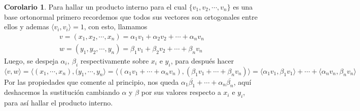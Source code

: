 \documentclass[10pt]{article}
\theoremstyle{definition}
\newtheorem{corollary}{Corolario}[theorem]
\begin{document}
\begin{corollary}
    Para hallar un producto interno para el cual $\{v_1,v_2,\cdots,v_n\}$ es una base ortonormal primero recordemos que todos sus vectores son ortogonales entre ellos y ademas $\langle v_i,v_i\rangle=1$, con esto, llamamos
    $$\begin{matrix}
v=( x_{1} ,x_{2} ,\cdots ,x_{n}) =\alpha _{1} v_{1} +\alpha _{2} v_{2} +\cdots +\alpha _{n} v_{n}\\
w=( y_{1} ,y_{2} ,\cdots ,y_{n}) =\beta _{1} v_{1} +\beta _{2} v_{2} +\cdots +\beta _{n} v_{n}
\end{matrix}$$
Luego, se despeja $\alpha_i,\ \beta_i$ respectivamente sobre $x_i$ e $y_i$, para después hacer $$\langle v,w\rangle=\langle (x_1,\cdots,x_n),(y_1,\cdots,y_n\rangle=\langle(\alpha_1v_1+\cdots+\alpha_nv_n),(\beta_1v_1+\cdots+\beta_nv_n)\rangle=\langle\alpha_1v_1,\beta_1v_1\rangle+\cdots+\langle\alpha_nv_n,\beta_nv_n\rangle$$
Por las propiedades que comente al principio, nos queda $\alpha_1\overline{\beta_1}+\cdots+\alpha_n\overline{\beta_n}$, aquí deshacemos la sustitución cambiando $\alpha$ y $\beta$ por sus valores respecto a $x_i$ e $y_i$, para así hallar el producto interno.
\end{corollary}
\end{document}
